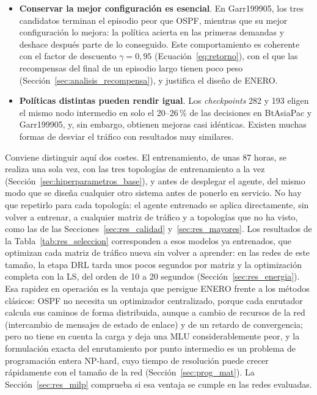 \begin{itemize}
	\item \textbf{Conservar la mejor configuración es esencial}. En Garr199905, los tres candidatos terminan el episodio peor que OSPF, mientras que su mejor configuración lo mejora: la política acierta en las primeras demandas y deshace después parte de lo conseguido. Este comportamiento es coherente con el factor de descuento $\gamma = 0{,}95$ (Ecuación~\eqref{eq:retorno}), con el que las recompensas del final de un episodio largo tienen poco peso (Sección~\ref{sec:analisis_recompensa}), y justifica el diseño de ENERO.
	\item \textbf{Políticas distintas pueden rendir igual}. Los \textit{checkpoints} 282 y 193 eligen el mismo nodo intermedio en solo el 20--26\,\% de las decisiones en BtAsiaPac y Garr199905, y, sin embargo, obtienen mejoras casi idénticas. Existen muchas formas de desviar el tráfico con resultados muy similares.
\end{itemize}

Conviene distinguir aquí dos costes. El entrenamiento, de unas 87 horas, se realiza una sola vez, con las tres topologías de entrenamiento a la vez (Sección~\ref{sec:hiperparametros_base}), y antes de desplegar el agente, del mismo modo que se diseña cualquier otro sistema antes de ponerlo en servicio. No hay que repetirlo para cada topología: el agente entrenado se aplica directamente, sin volver a entrenar, a cualquier matriz de tráfico y a topologías que no ha visto, como las de las Secciones~\ref{sec:res_calidad} y~\ref{sec:res_mayores}. Los resultados de la Tabla~\ref{tab:res_seleccion} corresponden a esos modelos ya entrenados, que optimizan cada matriz de tráfico nueva sin volver a aprender: en las redes de este tamaño, la etapa DRL tarda unos pocos segundos por matriz y la optimización completa con la LS, del orden de 10 a 20 segundos (Sección~\ref{sec:res_energia}). Esa rapidez en operación es la ventaja que persigue ENERO frente a los métodos clásicos: OSPF no necesita un optimizador centralizado, porque cada enrutador calcula sus caminos de forma distribuida, aunque a cambio de recursos de la red (intercambio de mensajes de estado de enlace) y de un retardo de convergencia; pero no tiene en cuenta la carga y deja una MLU considerablemente peor, y la formulación exacta del enrutamiento por punto intermedio es un problema de programación entera NP-hard, cuyo tiempo de resolución puede crecer rápidamente con el tamaño de la red (Sección~\ref{sec:prog_mat}). La Sección~\ref{sec:res_milp} comprueba si esa ventaja se cumple en las redes evaluadas.

